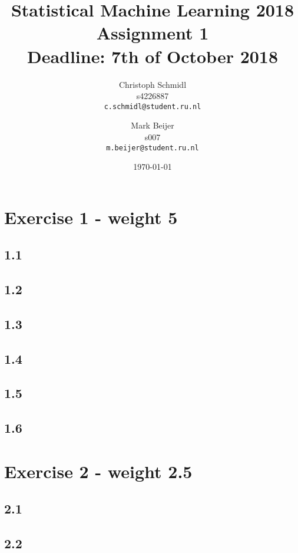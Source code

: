 \documentclass[a4paper]{article}
\title{Statistical Machine Learning 2018\\Assignment 1\\Deadline: 7th of October 2018}
\author{
  Christoph Schmidl\\ s4226887\\      \texttt{c.schmidl@student.ru.nl}
  \and
  Mark Beijer\\ s007\\     \texttt{m.beijer@student.ru.nl}
}
\date{\today}
\begin{document}
\maketitle


\section*{Exercise 1 - weight 5}

\subsection*{1.1}




\subsection*{1.2}




\subsection*{1.3}





\subsection*{1.4}





\subsection*{1.5}


\subsection*{1.6}



\section*{Exercise 2 - weight 2.5}

\subsection*{2.1}




\subsection*{2.2}
\end{document}

